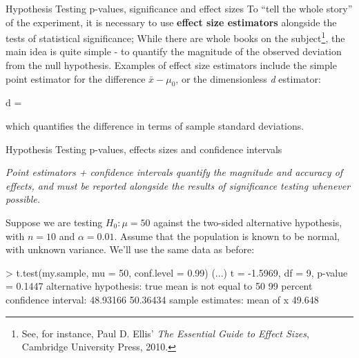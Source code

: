 \documentclass[t]{beamer}
\begin{document}

\begin{ftst}
{Hypothesis Testing}
{p-values, significance and effect sizes}
To ``tell the whole story'' of the experiment, it is necessary to use \textbf{effect size estimators} alongside the tests of statistical significance; 
\vone
While there are whole books on the subject\footnote[3]{\tiny See, for instance, Paul D. Ellis' \textit{The Essential Guide to Effect Sizes}, Cambridge University Press, 2010.}, the main idea is quite simple - to quantify the magnitude of the observed deviation from the null hypothesis.
\vone
Examples of effect size estimators include the simple point estimator for the difference $\bar{x} - \mu_0$, or the dimensionless \textit{d} estimator:

\beqs
d = 
\eqs

\noindent which quantifies the difference in terms of sample standard deviations.
\vone
\end{ftst}


\begin{ftstf}
{Hypothesis Testing}
{p-values, effects sizes and confidence intervals}
\begin{block}{}
\centering\textit{Point estimators + confidence intervals quantify the magnitude and accuracy of effects, and must be reported alongside the results of significance testing whenever possible.}
\end{block}
\vhalf
Suppose we are testing $H_0: \mu=50$ against the two-sided alternative hypothesis, with $n=10$ and $\alpha=0.01$. Assume that the population is known to be normal, with unknown variance. We'll use the same data as before:
\vhalf
\begin{rcode}
> t.test(my.sample, mu = 50, conf.level = 0.99)
(...)
t = -1.5969, df = 9, p-value = 0.1447
alternative hypothesis: true mean is not equal to 50
99 percent confidence interval:
 48.93166 50.36434
sample estimates:
mean of x 
   49.648 
\end{rcode}
\end{ftstf}
\end{document}
